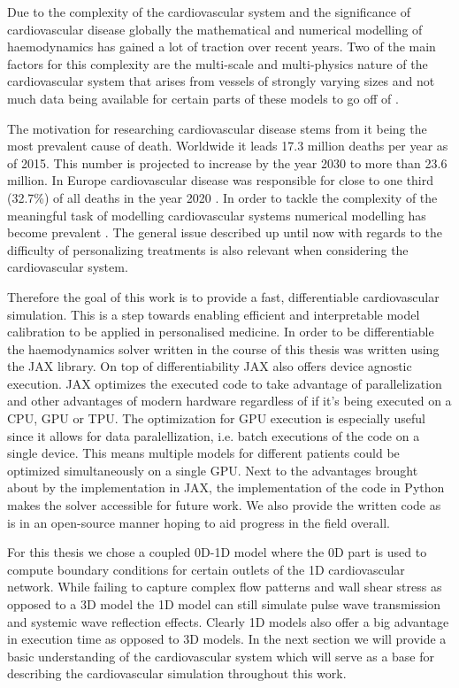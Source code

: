 \documentclass[a4paper, oneside]{discothesis}
\begin{document}
Due to the complexity of the cardiovascular system and the significance of cardiovascular disease globally the mathematical and numerical modelling of haemodynamics has gained a lot of traction over recent years.
Two of the main factors for this complexity are the multi-scale and multi-physics nature of the cardiovascular system that arises from vessels of strongly varying sizes and not much data being available for certain parts of these models to go off of \cite{quarteroni2016geometric}.

The motivation for researching cardiovascular disease stems from it being the most prevalent cause of death.
Worldwide it leads 17.3 million deaths per year as of 2015.
This number is projected to increase by the year 2030 to more than 23.6 million. \cite{update2015heart}
In Europe cardiovascular disease was responsible for close to one third (32.7\%) of all deaths in the year 2020 \cite{Coelho2020}.
In order to tackle the complexity of the meaningful task of modelling cardiovascular systems numerical modelling has become prevalent \cite{formaggia2009multiscale,quarteroni2016geometric,black2020p14,el2018investigating,qureshi2014numerical,reichold2009vascular}.
The general issue described up until now with regards to the difficulty of personalizing treatments is also relevant when considering the cardiovascular system.

Therefore the goal of this work is to provide a fast, differentiable cardiovascular simulation.
This is a step towards enabling efficient and interpretable model calibration to be applied in personalised medicine.
In order to be differentiable the haemodynamics solver written in the course of this thesis was written using the JAX library.
On top of differentiability JAX also offers device agnostic execution.
JAX optimizes the executed code to take advantage of parallelization and other advantages of modern hardware regardless of if it's being executed on a CPU, GPU or TPU.
The optimization for GPU execution is especially useful since it allows for data paralellization, i.e. batch executions of the code on a single device.
This means multiple models for different patients could be optimized simultaneously on a single GPU.
Next to the advantages brought about by the implementation in JAX, the implementation of the code in Python makes the solver accessible for future work.
We also provide the written code as is in an open-source manner hoping to aid progress in the field overall.

For this thesis we chose a coupled 0D-1D model where the 0D part is used to compute boundary conditions for certain outlets of the 1D cardiovascular network.
While failing to capture complex flow patterns and wall shear stress as opposed to a 3D model the 1D model can still simulate pulse wave transmission and systemic wave reflection effects.
Clearly 1D models also offer a big advantage in execution time as opposed to 3D models. \cite{shi2011review,pfaller2020using,arzani2022machine} 
In the next section we will provide a basic understanding of the cardiovascular system which will serve as a base for describing the cardiovascular simulation throughout this work.
\end{document}
